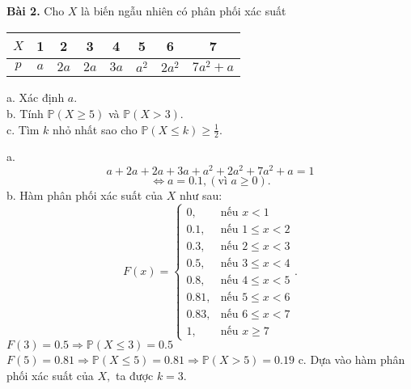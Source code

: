 \documentclass[12pt,a4paper]{article}
\begin{document}
    \begin{mybox}
        \textbf{Bài 2.} Cho $X$ là biến ngẫu nhiên có phân phối xác suất
            \begin{table}[H]
                \begin{center}
                    \begin{tabular}{|c|c|c|c|c|c|c|c|}
                        \hline 
                        $X$ & 1 & 2 & 3 & 4 & 5 & 6 & 7 \\ 
                        \hline 
                        $p$ & $a$ & $2a$ & $2a$ & $3a$ & $a^2$ & $2 a^2$  & $7a^2 + a$ \\ 
                        \hline 
                        \end{tabular}
                \end{center}
            \end{table}
            a. Xác định $a.$\\
            b. Tính $\mathbb{P} \left( {X \geqslant 5} \right)$ và $\mathbb{P} \left( {X > 3} \right).$\\
            c. Tìm $k$ nhỏ nhất sao cho $\mathbb{P} \left( {X \leqslant k } \right) \geqslant \frac{1}{2}.$
    \end{mybox}
    a. $$a + 2a + 2a + 3a + {a^2} + 2{a^2} + 7{a^2} + a = 1$$
    $$\Leftrightarrow a = 0.1,\left( \text{vì } {a \geqslant 0} \right).$$
    b. Hàm phân phối xác suất của $X$ như sau:
    $$F \left( x \right) = 
    \begin{cases}
        0, &\text{nếu } x < 1\\
        0.1, &\text{nếu } 1 \leqslant x < 2\\
        0.3, &\text{nếu } 2 \leqslant x < 3\\
        0.5, &\text{nếu } 3 \leqslant x < 4\\
        0.8, &\text{nếu } 4 \leqslant x < 5\\
        0.81, &\text{nếu } 5 \leqslant x < 6\\
        0.83, &\text{nếu } 6 \leqslant x < 7\\
        1, &\text{nếu } x \geqslant 7
    \end{cases}.$$ 
    $F \left( 3 \right) = 0.5 \Rightarrow \mathbb{P} \left( {X \leqslant 3} \right) = 0.5$\\
    $F \left( 5 \right) = 0.81 \Rightarrow \mathbb{P} \left( {X \leqslant 5} \right) = 0.81 \Rightarrow \mathbb{P} \left( {X > 5} \right) = 0.19$
    c. Dựa vào hàm phân phối xác suất của $X,$ ta được $k = 3.$
\end{document}
